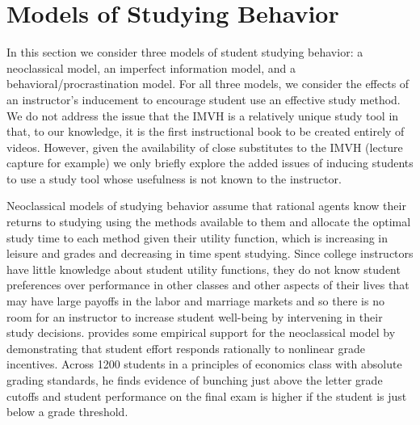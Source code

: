 \documentclass[12pt]{article}
\begin{document}

\section{Models of Studying Behavior}

In this section we consider three models of student studying behavior: a neoclassical model, an imperfect information model, and a behavioral/procrastination model. For all three models, we consider the effects of an instructor's inducement to encourage student use an effective study method. We do not address the issue that the IMVH is a relatively unique study tool in that, to our knowledge, it is the first instructional book to be created entirely of videos. However, given the availability of close substitutes to the IMVH (lecture capture for example) we only briefly explore the added issues of inducing students to use a study tool whose usefulness is not known to the instructor.

Neoclassical models of studying behavior assume that rational agents know their returns to studying using the methods available to them and allocate the optimal study time to each method given their utility function, which is increasing in leisure and grades and decreasing in time spent studying. Since college instructors have little knowledge about student utility functions, they do not know student preferences over performance in other classes and other aspects of their lives that may have large payoffs in the labor and marriage markets and so there is no room for an instructor to increase student well-being by intervening in their study decisions.   \textcite{oettinger2002} provides some empirical support for the neoclassical model by demonstrating that student effort responds rationally to nonlinear grade incentives. Across 1200 students in a principles of economics class with absolute grading standards, he finds evidence of bunching just above the letter grade cutoffs and student performance on the final exam is higher if the student is just below a grade threshold.
\end{document}
